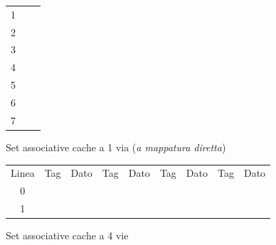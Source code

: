 \begin{figure}[H]
\begin{subfigure}{0.5\textwidth}
\begin{center}
\begin{tabular}{ccc}
				\multicolumn{1}{c|}{1} & \multicolumn{1}{c|}{} & \multicolumn{1}{c|}{} \\ \cline{2-3}
				\multicolumn{1}{c|}{2} & \multicolumn{1}{c|}{} & \multicolumn{1}{c|}{} \\ \cline{2-3}
				\multicolumn{1}{c|}{3} & \multicolumn{1}{c|}{} & \multicolumn{1}{c|}{} \\ \cline{2-3}
				\multicolumn{1}{c|}{4} & \multicolumn{1}{c|}{} & \multicolumn{1}{c|}{} \\ \cline{2-3}
				\multicolumn{1}{c|}{5} & \multicolumn{1}{c|}{} & \multicolumn{1}{c|}{} \\ \cline{2-3}
				\multicolumn{1}{c|}{6} & \multicolumn{1}{c|}{} & \multicolumn{1}{c|}{} \\ \cline{2-3}
				\multicolumn{1}{c|}{7} & \multicolumn{1}{c|}{} & \multicolumn{1}{c|}{} \\ \cline{2-3}
			\end{tabular}
		\end{center}
		\caption{Set associative cache a 1 via (\textit{a mappatura diretta})}
	\end{subfigure}
	\vskip10mm
	\begin{subfigure}{\textwidth}
		\begin{center}
			\begin{tabular}{ccccccccc}
				Linea                  & Tag                   & Dato                  & Tag                   & Dato                  & Tag                   & Dato                  & Tag                   & Dato                  \\ \cline{2-9}
				\multicolumn{1}{c|}{0} & \multicolumn{1}{c|}{} & \multicolumn{1}{c|}{} & \multicolumn{1}{c|}{} & \multicolumn{1}{c|}{} & \multicolumn{1}{c|}{} & \multicolumn{1}{c|}{} & \multicolumn{1}{c|}{} & \multicolumn{1}{c|}{} \\ \cline{2-9}
				\multicolumn{1}{c|}{1} & \multicolumn{1}{l|}{} & \multicolumn{1}{l|}{} & \multicolumn{1}{l|}{} & \multicolumn{1}{l|}{} & \multicolumn{1}{l|}{} & \multicolumn{1}{l|}{} & \multicolumn{1}{l|}{} & \multicolumn{1}{l|}{} \\ \cline{2-9}
			\end{tabular}
		\end{center}
		\caption{Set associative cache a 4 vie}
	\end{subfigure}
	\vskip10mm
	\begin{subfigure}{\textwidth}
		\begin{center}
			\begin{tabular}{ccccccccccccc}

\end{tabular}
\end{center}
\end{subfigure}
\end{figure}
